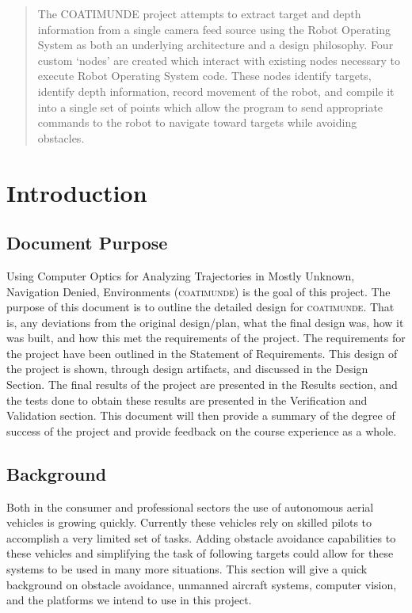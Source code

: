\documentclass{article}[12]
\begin{document}
\begin{abstract}
	The COATIMUNDE project attempts to extract target and depth information from a single camera feed source using the Robot Operating System as both an underlying architecture and a design philosophy. Four custom `nodes' are created which interact with existing nodes necessary to execute Robot Operating System code. These nodes identify targets, identify depth information, record movement of the robot, and compile it into a single set of points which allow the program to send appropriate commands to the robot to navigate toward targets while avoiding obstacles.
	
\end{abstract}


\tableofcontents

\newpage

\section{Introduction}

	\subsection{Document Purpose}
	
	Using Computer Optics for Analyzing Trajectories in Mostly Unknown, Navigation Denied, Environments (\textsc{coatimunde}) is the goal of this project. The purpose of this document is to outline the detailed design for \textsc{coatimunde}. That is, any deviations from the original design/plan, what the final design was, how it was built, and how this met the requirements of the project.  The requirements for the project have been outlined in the Statement of Requirements. This design of the project is shown, through design artifacts, and discussed in the Design Section. The final results of the project are presented in the Results section, and the tests done to obtain these results are presented in the Verification and Validation section. This document will then provide a summary of the degree of success of the project and provide feedback on the course experience as a whole.
	
	\subsection{Background}
	
	Both in the consumer and professional sectors the use of autonomous aerial vehicles is growing quickly. Currently these vehicles rely on skilled pilots to accomplish a very limited set of tasks. Adding obstacle avoidance capabilities to these vehicles and simplifying the task of following targets could allow for these systems to be used in many more situations. This section will give a quick background on obstacle avoidance, unmanned aircraft systems, computer vision, and the platforms we intend to use in this project.
\end{document}
